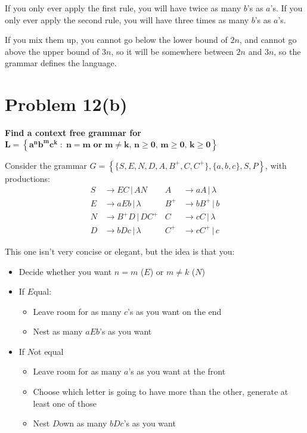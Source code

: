 \documentclass{report}
\begin{document}
If you only ever apply the first rule, you will have twice as many $b$'s as $a$'s.
If you only ever apply the second rule, you will have three times as many $b$'s as $a$'s.

If you mix them up, you cannot go below the lower bound of $2n$, and cannot go above the upper bound of $3n$, so it will be somewhere
between $2n$ and $3n$, so the grammar defines the language.

\section*{Problem 12(b)}
\textbf{Find a context free grammar for \\ $\mathbf{ L = \left\{  a^nb^mc^k \; : \; n = m \text{ or } m \neq k    ,\, n \geq 0,\, m \geq 0 ,\, k \geq 0  \right\} }$}

Consider the grammar $G = \left\{ \{S, E, N, D, A, B^+, C, C^+\}, \{a, b, c\}, S, P \right\}$, with productions:
\begin{align*}
        S &\rightarrow EC \, | \, AN          &   A &\rightarrow aA \, | \, \lambda    \\
        E &\rightarrow  a E b \, | \, \lambda &   B^+ &\rightarrow bB^+ \, | \, b      \\
        N &\rightarrow B^+D \, | \, DC^+      &   C &\rightarrow cC \, | \, \lambda     \\
        D &\rightarrow bDc \, | \, \lambda    &   C^+ &\rightarrow cC^+ \,|\, c 
\end{align*}

This one isn't very concise or elegant, but the idea is that you:
\begin{itemize}
        \item Decide whether you want $n=m$ ($E$) or $m \neq k$ ($N$)
        \item If $E$qual:
        \begin{itemize}
                \item Leave room for as many $c$'s as you want on the end
                \item Nest as many $aEb$'s as you want
        \end{itemize}
        \item If $N$ot equal
        \begin{itemize}
                \item Leave room for as many $a$'s as you want at the front
                \item Choose which letter is going to have more than the other, generate at least one of those
                \item Nest $D$own as many $bDc$'s as you want
        \end{itemize}
\end{itemize}
\end{document}
